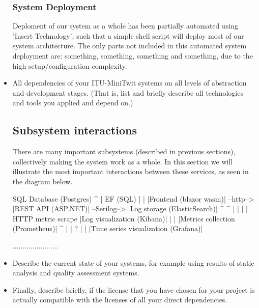 \begin{itemize}
  \subsubsection{System Deployment}
  Deploment of our system as a whole has been partially automated using 'Insert Technology', such that a simple shell script will deploy most of our system architecture.
  The only parts not included in this automated system deployment are: something, something, something and something, due to the high setup/configuration complexity.

  \item All dependencies of your ITU-MiniTwit systems on all levels of abstraction and development stages. (That is, list and briefly describe all technologies and tools you applied and depend on.)
  \subsection{Subsystem interactions}
  There are many important subsystems (described in previous sections), collectively making the system work as a whole.
  In this section we will illustrate the most important interactions between these services, as seen in the diagram below.\newline

                                         SQL Database (Postgres)
                                              ^
                                              |
                                            EF (SQL)
                                              |
                                              |
  |Frontend (blazor wasm)| --http--> |REST API (ASP.NET)| --Serilog--> |Log storage (ElasticSearch)|
                                              ^                                  ^
                                              |                                  |
                                              |                                  |
                                      HTTP metric scrape             |Log visualization (Kibana)|
                                              |
                                              |
                                |Metrics collection (Prometheus)|
                                              ^
                                              |
                                              |
                                              ?
                                              |
                                              |
                              |Time series visualization (Grafana)|


                                              


  
  .......................
  
  \item Describe the current state of your systems, for example using results of static analysis and quality assessment systems.
  \item Finally, describe briefly, if the license that you have chosen for your project is actually compatible with the licenses of all your direct dependencies.
  
\end{itemize}